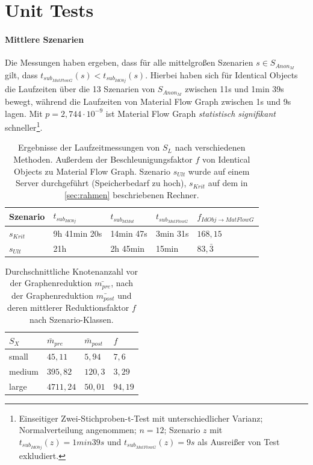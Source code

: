 \chapter{Unit Tests} \label{sec:results}


\subsubsection{Mittlere Szenarien}



Die Messungen haben ergeben, dass für alle mittelgroßen Szenarien $s \in S_{Anon_M}$ gilt, dass $t_{sub_{MatFlowG}}(s) < t_{sub_{IdObj}}(s)$. Hierbei haben sich für Identical Objects die Laufzeiten über die 13 Szenarien von $S_{Anon_M}$ zwischen 11s und 1min 39s bewegt, während die Laufzeiten von Material Flow Graph zwischen 1s und 9s lagen. Mit $p=2,744 \cdot 10^{-9}$ ist Material Flow Graph \textit{statistisch signifikant} schneller\footnote{Einseitiger Zwei-Stichproben-t-Test mit unterschiedlicher Varianz; Normalverteilung angenommen; $n=12$; Szenario $z$ mit $t_{sub_{IdObj}}(z) = 1min 39s$ und $t_{sub_{MatFlowG}}(z) = 9s$ als Ausreißer von Test exkludiert.}. 

\begin{table}[ht]
	\centering
	\begin{tabular}{l|l|l|l|l}
		Szenario & $t_{sub_{IdObj}}$ & $t_{sub_{IdMat}}$& $t_{sub_{MatFlowG}}$ & $f_{IdObj \rightarrow MatFlowG}$ \\
		\midrule
		$s_{Krit}$ & 9h 41min 20s & 14min 47s & 3min 31s & $168,15$ \\
		$s_{Ult}$ & 21h & 2h 45min & 15min & $83,\bar{3}$ \\
		
	\end{tabular}
	\caption{Ergebnisse der Laufzeitmessungen von $S_L$ nach verschiedenen Methoden. Außerdem der Beschleunigungsfaktor $f$ von Identical Objects zu Material Flow Graph. Szenario $s_{Ult}$ wurde auf einem Server durchgeführt (Speicherbedarf zu hoch), $s_{Krit}$ auf dem in \autoref{sec:rahmen} beschriebenen Rechner.}
	\label{tab:large_scenarios}
\end{table}

\begin{table}[ht]
	\centering
	\begin{tabular}{l|l|l|l}
		$S_X$ & $\bar{m}_{pre}$ & $\bar{m}_{post}$& $f$ \\
		\midrule
		small & $45,11$ & $5,94$ & $7,6$ \\
		medium & $395,82$ & $120,3$ & $3,29$ \\
		large & $4711,24$ & $50,01$ & $94,19$ \\
	\end{tabular}
	\caption{Durchschnittliche Knotenanzahl vor der Graphenreduktion $\bar{m_{pre}}$, nach der Graphenreduktion $\bar{m_{post}}$ und deren mittlerer Reduktionsfaktor $f$ nach Szenario-Klassen.}
	\label{tab:scenarios_node_nb}
\end{table}

